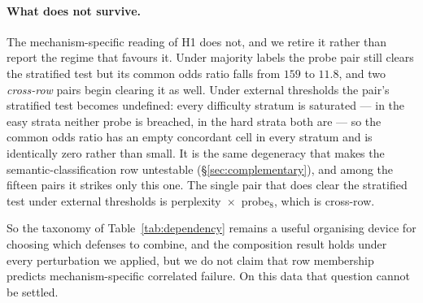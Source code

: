 \paragraph{What does not survive.}
The mechanism-specific reading of H1 does not, and we retire it rather than report the regime
that favours it. Under majority labels the probe pair still clears the stratified test but its
common odds ratio falls from $159$ to $11.8$, and two \emph{cross-row} pairs begin clearing it
as well. Under external thresholds the pair's stratified test becomes undefined: every
difficulty stratum is saturated --- in the easy strata neither probe is breached, in the hard
strata both are --- so the common odds ratio has an empty concordant cell in every stratum and
is identically zero rather than small. It is the same degeneracy that makes the
semantic-classification row untestable (\S\ref{sec:complementary}), and among the fifteen pairs
it strikes only this one. The single pair that does clear the stratified test under external
thresholds is perplexity~$\times$~probe$_{8}$, which is cross-row.

So the taxonomy of Table~\ref{tab:dependency} remains a useful organising device for choosing
which defenses to combine, and the composition result holds under every perturbation we
applied, but we do not claim that row membership predicts mechanism-specific correlated
failure. On this data that question cannot be settled.
